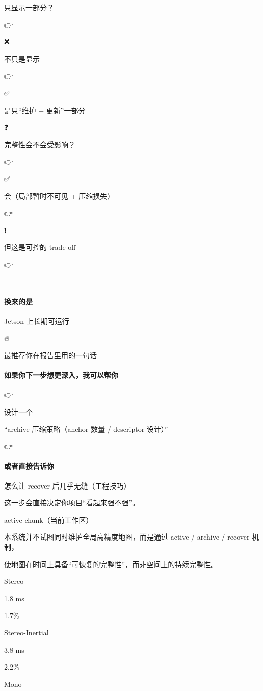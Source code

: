 \documentclass[12pt]{article}
\begin{document}
只显示一部分？

👉

❌

不只是显示

👉

✅

是只“维护 + 更新”一部分

❓

完整性会不会受影响？

👉

✅

会（局部暂时不可见 + 压缩损失）

👉

❗

但这是可控的 trade-off

👉

🎯

\paragraph{换来的是}
Jetson 上长期可运行

🔥

最推荐你在报告里用的一句话

\paragraph{如果你下一步想更深入，我可以帮你}
👉

设计一个

“archive 压缩策略（anchor 数量 / descriptor 设计）”

👉

\paragraph{或者直接告诉你}
怎么让 recover 后几乎无缝（工程技巧）

这一步会直接决定你项目“看起来强不强”。

active chunk（当前工作区）

本系统并不试图同时维护全局高精度地图，而是通过 active / archive / recover 机制，

使地图在时间上具备“可恢复的完整性”，而非空间上的持续完整性。

Stereo

1.8 ms

1.7\%

Stereo-Inertial

3.8 ms

2.2\%

Mono
\end{document}
